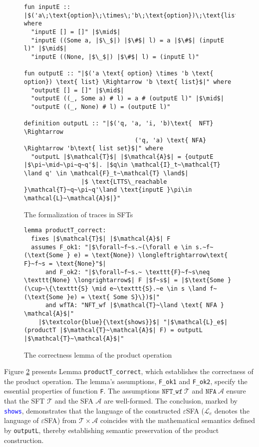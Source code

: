 \documentclass[a4paper,UKenglish,cleveref, autoref, thm-restate]{lipics-v2021}
\begin{document}
\begin{figure}[hbt!]
	\begin{lstlisting}
fun inputE :: |$('a\;\text{option}\;\times\;'b\;\text{option})\;\text{list}\;\Rightarrow\;'a\;\text{list}$| where
  "inputE [] = []" |$\mid$|
  "inputE ((Some a, |$\_$|) |$\#$| l) = a |$\#$| (inputE l)" |$\mid$|
  "inputE ((None, |$\_$|) |$\#$| l) = (inputE l)"

fun outputE :: "|$('a \text{ option} \times 'b \text{ option}) \text{ list} \Rightarrow 'b \text{ list}$|" where
  "outputE [] = []" |$\mid$|
  "outputE ((_, Some a) # l) = a # (outputE l)" |$\mid$|
  "outputE ((_, None) # l) = (outputE l)"

definition outputL :: "|$('q, 'a, 'i, 'b)\text{  NFT} \Rightarrow 
                               ('q, 'a) \text{ NFA} \Rightarrow 'b\text{ list set}$|" where
  "outputL |$\mathcal{T}$| |$\mathcal{A}$| = {outputE |$\pi~\mid~\pi~q~q'$|. |$q\in \mathcal{I}_t~\mathcal{T} \land q' \in \mathcal{F}_t~\mathcal{T} \land$|
                |$ \text{LTTS\_reachable }\mathcal{T}~q~\pi~q'\land \text{inputE }\pi\in \mathcal{L}~\mathcal{A}$|}" 
	\end{lstlisting}
\caption{The formalization of traces in SFTs}
\label{fig-def-output}
\end{figure}


\begin{figure}[hbt!]
	\begin{lstlisting}
lemma productT_correct:
  fixes |$\mathcal{T}$| |$\mathcal{A}$| F
  assumes F_ok1: "|$\forall~f~s.~(\forall e \in s.~f~(\text{Some } e) = \text{None}) \longleftrightarrow\text{ F}~f~s = \text{None}"$|
      and F_ok2: "|$\forall~f~s.~ \texttt{F}~f~s\neq \texttt{None} \longrightarrow$| F |$f~s$| = |$\text{Some }(\cup~\{\texttt{S} \mid e~\texttt{S}.~e \in s \land f~(\text{Some }e) = \text{ Some S}\})$|"
      and wfTA: "NFT_wf |$\mathcal{T}~\land \text{ NFA } \mathcal{A}$|"
    |$\textcolor{blue}{\text{shows}}$| "|$\mathcal{L}_e$| (productT |$\mathcal{T}~\mathcal{A}$| F) = outputL |$\mathcal{T}~\mathcal{A}$|"

	\end{lstlisting}
\caption{The correctness lemma of the product operation}
\label{fig-def-product-correct}
\end{figure}

Figure \ref{fig-def-product-correct} presents Lemma \texttt{productT\_correct}, which establishes the correctness of the product operation. The lemma's assumptions, \texttt{F\_ok1} and \texttt{F\_ok2}, specify the essential properties of function \texttt{F}. 
The assumptions $\texttt{NFT\_wf}~\mathcal{T}$ and $\texttt{NFA}~\mathcal{A}$ ensure that the SFT $\mathcal{T}$ and the SFA $\mathcal{A}$ are well-formed.
The conclusion, marked by \textcolor{blue}{\texttt{shows}}, demonstrates that the language of the constructed $\varepsilon$SFA ($\mathcal{L}_e$ denotes the language of $\varepsilon$SFA) from $\mathcal{T} \times \mathcal{A}$ coincides with the mathematical semantics defined by \texttt{outputL}, thereby establishing semantic preservation of the product construction.
\end{document}
